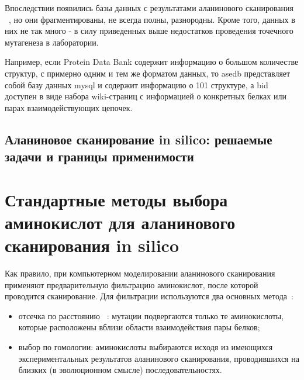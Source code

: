 Впоследствии появились базы данных с результатами аланинового сканирования ~\cite{asedb2001, bid2003}, но они фрагментированы, не всегда полны, разнородны. Кроме того, данных в них не так много - в силу приведенных выше недостатков проведения точечного мутагенеза в лаборатории.

Например, если Protein Data Bank содержит информацию о большом количестве структур, с примерно одним и тем же форматом данных, то asedb представляет собой базу данных mysql и содержит информацию о 101 структуре, а bid доступен в виде набора wiki-страниц с информацией о конкретных белках или парах взаимодействующих цепочек.
 \newpage
\subsection{Аланиновое сканирование in silico: решаемые задачи и границы применимости}


\newpage
\section{Стандартные методы выбора аминокислот для аланинового сканирования in silico}

Как правило, при компьютерном моделировании аланинового сканирования применяют предварительную фильтрацию аминокислот, после которой проводится сканирование. Для фильтрации используются два основных метода~\cite{hotspots2012rev}:
\begin{itemize}
\item отсечка по расстоянию ~\cite{kortemme2004}: мутации подвергаются только те аминокислоты, которые расположены вблизи области взаимодействия пары белков;

\item выбор по гомологии: аминокислоты выбираются исходя из имеющихся экспериментальных результатов аланинового сканирования, проводившихся на близких (в эволюционном смысле) последовательностях.
\end{itemize}

